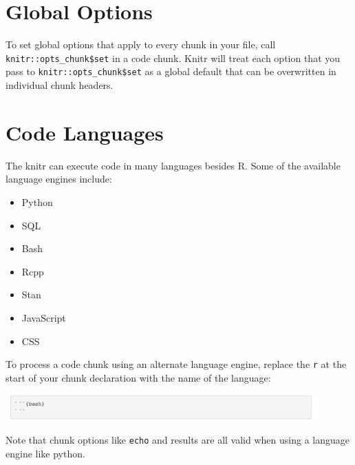\documentclass[]{article}
\providecommand{\tightlist}{%
  \setlength{\itemsep}{0pt}\setlength{\parskip}{0pt}}
\begin{document}
\hypertarget{global-options}{%
\section{Global Options}\label{global-options}}

To set global options that apply to every chunk in your file, call
\texttt{knitr::opts\_chunk\$set} in a code chunk. Knitr will treat each
option that you pass to \texttt{knitr::opts\_chunk\$set} as a global
default that can be overwritten in individual chunk headers.

\hypertarget{code-languages}{%
\section{Code Languages}\label{code-languages}}

The knitr can execute code in many languages besides R. Some of the
available language engines include:

\begin{itemize}
\tightlist
\item
  Python
\item
  SQL
\item
  Bash
\item
  Rcpp
\item
  Stan
\item
  JavaScript
\item
  CSS
\end{itemize}

To process a code chunk using an alternate language engine, replace the
\texttt{r} at the start of your chunk declaration with the name of the
language:

\includegraphics[width=0.9\textwidth,height=\textheight]{picture3.png}

Note that chunk options like \texttt{echo} and results are all valid
when using a language engine like python.
\end{document}
